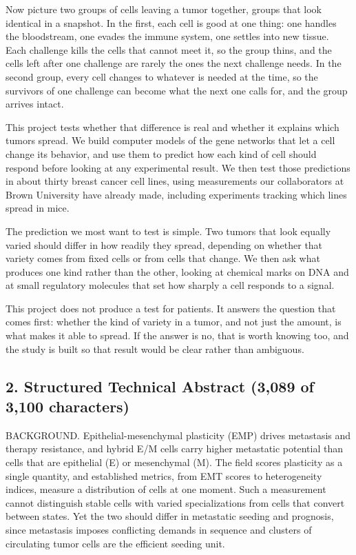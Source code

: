 \documentclass[12pt,letterpaper]{article}
\newcommand{\chg}[1]{\textcolor{chgcolor}{#1}}
\newcommand{\chg}[1]{#1}
\begin{document}
Now picture two groups of cells leaving a tumor together, groups that look identical in a snapshot. In the first, each cell is good at one thing: one handles the bloodstream, one evades the immune system, one settles into new tissue. \chg{Each challenge kills the cells that cannot meet it, so the group thins, and the cells left after one challenge are rarely the ones the next challenge needs.} In the second group, every cell changes to whatever is needed at the time\chg{, so the survivors of one challenge can become what the next one calls for, and the group arrives intact}.

This project tests whether that difference is real and whether it explains which tumors spread. We build computer models of the gene networks that let a cell change its behavior, and use them to predict how each kind of cell should respond before looking at any experimental result. We then test those predictions in about thirty breast cancer cell lines, using measurements our collaborators at Brown University have already made, including experiments tracking which lines spread in mice.

The prediction we most want to test is simple. Two tumors that look equally varied should differ in how readily they spread, depending on whether that variety comes from fixed cells or from cells that change. We then ask what produces one kind rather than the other, looking at chemical marks on DNA and at small regulatory molecules that set how sharply a cell responds to a signal.

This project does not produce a test for patients. It answers the question that comes first: whether the kind of variety in a tumor, and not just the amount, is what makes it able to spread. If the answer is no, that is worth knowing too, and the study is built so that result would be clear rather than ambiguous.

\subsection*{2. Structured Technical Abstract (3,089 of 3,100 characters)}

BACKGROUND. Epithelial-mesenchymal plasticity (EMP) drives metastasis and therapy resistance, and hybrid E/M cells carry higher metastatic potential than cells that are epithelial (E) or mesenchymal (M). The field scores plasticity as a single quantity, and \chg{established metrics, from EMT scores to heterogeneity indices, measure} a distribution of cells at one moment. Such a measurement cannot distinguish stable cells with varied specializations from cells that convert between states. Yet the two should differ in metastatic seeding and prognosis, since metastasis imposes conflicting demands in sequence and clusters of circulating tumor cells are the efficient seeding unit.
\end{document}
